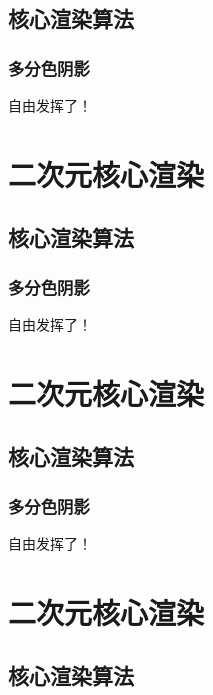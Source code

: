 \documentclass[twoside, 11pt, a4paper]{article}
\numberwithin{equation}{section} %
\begin{document}
\subsection{核心渲染算法}

\subsubsection{多分色阴影}

{%
自由发挥了！
}


\newpage

\section{二次元核心渲染}

\subsection{核心渲染算法}

\subsubsection{多分色阴影}

{%
自由发挥了！
}


\newpage

\section{二次元核心渲染}

\subsection{核心渲染算法}

\subsubsection{多分色阴影}

{%
自由发挥了！
}


\newpage

\section{二次元核心渲染}

\subsection{核心渲染算法}
\end{document}
